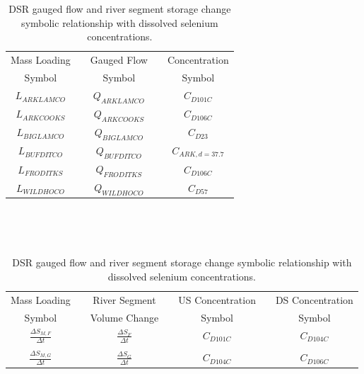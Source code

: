\begin{linenumbers}
\begin{table}[htbp]
	\centering
	\caption[DSR gauged flow and river segment storage change symbolic relationship with dissolved selenium concentrations. ]{DSR gauged flow and river segment storage change symbolic relationship with dissolved selenium concentrations.}
	\label{tab:concFlowStoreRelationship_DSR}
	\begin{subtable}{\textwidth}
		\centering
		\begin{tabular}{c c c c c} 
			\toprule  
			Mass Loading & & Gauged Flow & & Concentration \\
			Symbol & & Symbol & & Symbol\\
			\toprule 
			$ L_{ARKLAMCO} $ & & $ Q_{ARKLAMCO} $ & & $ C_{D101C} $\\
			$ L_{ARKCOOKS} $ & & $ Q_{ARKCOOKS} $ & & $ C_{D106C} $\\
			$ L_{BIGLAMCO} $ & & $ Q_{BIGLAMCO} $ & & $ C_{D23} $\\
			$ L_{BUFDITCO} $ & & $ Q_{BUFDITCO} $ & & $ C_{ARK,d=37.7} $\\
			$ L_{FRODITKS} $ & & $ Q_{FRODITKS} $ & & $ C_{D106C} $\\
			$ L_{WILDHOCO} $ & & $ Q_{WILDHOCO} $ & & $ C_{D57} $\\
			\bottomrule
		\end{tabular} \\
	\end{subtable}\\
	\tablevspace
	\begin{subtable}{\textwidth}
		\centering
		\begin{tabular}{c c c c c c c} 
			\toprule  
			Mass Loading & & River Segment & & US Concentration & & DS Concentration\\
			Symbol & & Volume Change & & Symbol & & Symbol\\
			\toprule 
			$ \displaystyle \frac{\Delta S_{M,F}}{\Delta t} $ & & $ \displaystyle \frac{\Delta S_F}{\Delta t} $ & & $ C_{D101C} $ & & $ C_{D104C} $\\ \\
			$ \displaystyle \frac{\Delta S_{M,G}}{\Delta t} $ & & $ \displaystyle \frac{\Delta S_G}{\Delta t} $ & & $ C_{D104C} $ & & $ C_{D106C} $\\
			\bottomrule
		\end{tabular} \\
	\end{subtable}\\
\end{table}


\end{linenumbers}
